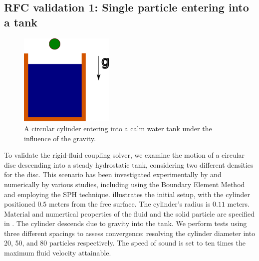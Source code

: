 \documentclass[preprint,12pt]{elsarticle}
\begin{document}
\subsection{RFC validation 1: Single particle entering into a tank}
\label{sec:rfc_validation_1_single_particle_entry}
\begin{figure}[!htpb]
  \centering
  \includegraphics[width=0.4\textwidth]{images/rfc_01_skillen_2013_particle_entry_in_hs_tank/Skillen_2013_particle_entry_in_hs_tank}
  \caption{A circular cylinder entering into a calm water tank under the
    influence of the gravity.}
  \label{fig:results_rfc_01_skillen_2013}
\end{figure}
To validate the rigid-fluid coupling solver, we examine the motion of a
circular disc descending into a steady hydrostatic tank, considering two
different densities for the disc. This scenario has been investigated
experimentally by \citet{greenhow1983nonlinear} and numerically by various
studies, including \citet{sun2006water} using the Boundary Element Method and
\cite{sun2018accurate} employing the SPH technique.
 illustrates the initial setup, with the
cylinder positioned $0.5$ meters from the free surface. The cylinder's radius
is $0.11$ meters. Material and numertical peoperties of the fluid and the
solid particle are specified in . The cylinder
descends due to gravity into the tank. We perform tests using three different
spacings to assess convergence: resolving the cylinder diameter into 20, 50,
and 80 particles respectively. The speed of sound is set to ten times the
maximum fluid velocity attainable.
\end{document}
